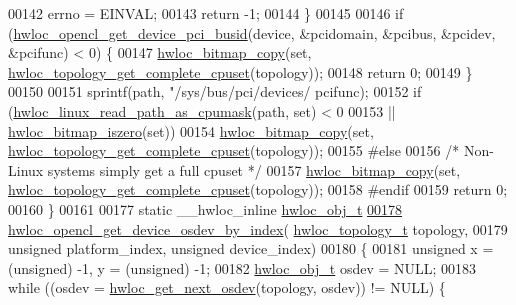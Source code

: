 \begin{DoxyCode}
00142                 errno = EINVAL;
00143                 \textcolor{keywordflow}{return} -1;
00144         \}
00145 
00146         \textcolor{keywordflow}{if} (\hyperlink{a00218_gab89e4d20f8a353299351b41849e35ac9}{hwloc\_opencl\_get\_device\_pci\_busid}(device, &pcidomain, &pcibus,
       &pcidev, &pcifunc) < 0) \{
00147                 \hyperlink{a00205_ga72a29824798b48784b8217471ec8f14c}{hwloc\_bitmap\_copy}(\textcolor{keyword}{set}, 
      \hyperlink{a00202_gaee30e03391c1ed7dfd617fb5c7bbb033}{hwloc\_topology\_get\_complete\_cpuset}(topology));
00148                 \textcolor{keywordflow}{return} 0;
00149         \}
00150 
00151         sprintf(path, \textcolor{stringliteral}{"/sys/bus/pci/devices/%
      pcifunc);
00152         \textcolor{keywordflow}{if} (\hyperlink{a00214_gaf72d83e273803226ce772973e37b85de}{hwloc\_linux\_read\_path\_as\_cpumask}(path, \textcolor{keyword}{set}) < 0
00153             || \hyperlink{a00205_ga5b64be28f5a7176ed8ad0d6a90bdf108}{hwloc\_bitmap\_iszero}(\textcolor{keyword}{set}))
00154                 \hyperlink{a00205_ga72a29824798b48784b8217471ec8f14c}{hwloc\_bitmap\_copy}(\textcolor{keyword}{set}, 
      \hyperlink{a00202_gaee30e03391c1ed7dfd617fb5c7bbb033}{hwloc\_topology\_get\_complete\_cpuset}(topology));
00155 \textcolor{preprocessor}{#else}
00156         \textcolor{comment}{/* Non-Linux systems simply get a full cpuset */}
00157         \hyperlink{a00205_ga72a29824798b48784b8217471ec8f14c}{hwloc\_bitmap\_copy}(\textcolor{keyword}{set}, 
      \hyperlink{a00202_gaee30e03391c1ed7dfd617fb5c7bbb033}{hwloc\_topology\_get\_complete\_cpuset}(topology));
00158 \textcolor{preprocessor}{#endif}
00159   \textcolor{keywordflow}{return} 0;
00160 \}
00161 
00177 \textcolor{keyword}{static} \_\_hwloc\_inline \hyperlink{a00238}{hwloc\_obj\_t}
\hyperlink{a00218_gae39352d124cb330eb37b84b418ed6cc5}{00178} \hyperlink{a00218_gae39352d124cb330eb37b84b418ed6cc5}{hwloc\_opencl\_get\_device\_osdev\_by\_index}(
      \hyperlink{a00186_ga9d1e76ee15a7dee158b786c30b6a6e38}{hwloc\_topology\_t} topology,
00179                                        \textcolor{keywordtype}{unsigned} platform\_index, \textcolor{keywordtype}{unsigned} device\_index)
00180 \{
00181         \textcolor{keywordtype}{unsigned} x = (unsigned) -1, y = (\textcolor{keywordtype}{unsigned}) -1;
00182         \hyperlink{a00238}{hwloc\_obj\_t} osdev = NULL;
00183         \textcolor{keywordflow}{while} ((osdev = \hyperlink{a00204_ga8b4584c8949e2c5f1c97ba7fe92b8145}{hwloc\_get\_next\_osdev}(topology, osdev)) != NULL) \{
}
\end{DoxyCode}
